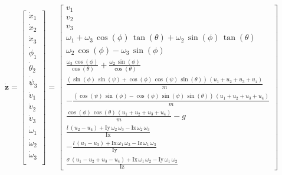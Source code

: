 \documentclass{article}
\begin{document}
\begin{equation}
    \dot{\boldsymbol{z}} = 
    \begin{bmatrix}
        \dot{x}_1 \\
        \dot{x}_2 \\
        \dot{x}_3 \\
        \dot{\phi}_1 \\
        \dot{\theta}_2 \\
        \dot{\psi}_3 \\
        \dot{v}_1 \\
        \dot{v}_2 \\
        \dot{v}_3 \\
        \dot{\omega}_1 \\
        \dot{\omega}_2 \\
        \dot{\omega}_3 \\
    \end{bmatrix}
    =
    \begin{bmatrix}
        v_1 \\
        v_2 \\
        v_3 \\[4pt]
        \omega_1 +\omega_3 \,\cos \left(\phi \right)\,\tan \left(\theta \right)+\omega_2 \,\sin \left(\phi \right)\,\tan \left(\theta \right)\\
        \omega_2 \,\cos \left(\phi \right)-\omega_3 \,\sin \left(\phi \right)\\[4pt]
        \frac{\omega_3 \,\cos \left(\phi \right)}{\cos \left(\theta \right)}+\frac{\omega_2 \,\sin \left(\phi \right)}{\cos \left(\theta \right)}\\[4pt]
        \frac{{\left(\sin \left(\phi \right)\,\sin \left(\psi \right)+\cos \left(\phi \right)\,\cos \left(\psi \right)\,\sin \left(\theta \right)\right)}\,{\left(u_1 +u_2 +u_3 +u_4 \right)}}{m}\\[4pt]
        -\frac{{\left(\cos \left(\psi \right)\,\sin \left(\phi \right)-\cos \left(\phi \right)\,\sin \left(\psi \right)\,\sin \left(\theta \right)\right)}\,{\left(u_1 +u_2 +u_3 +u_4 \right)}}{m}\\[4pt]
        \frac{\cos \left(\phi \right)\,\cos \left(\theta \right)\,{\left(u_1 +u_2 +u_3 +u_4 \right)}}{m}-g\\[4pt]
        \frac{l\,{\left(u_2 -u_4 \right)}+\mathrm{Iy}\,\omega_2 \,\omega_3 -\mathrm{Iz}\,\omega_2 \,\omega_3 }{\mathrm{Ix}}\\[4pt]
        -\frac{l\,{\left(u_1 -u_3 \right)}+\mathrm{Ix}\,\omega_1 \,\omega_3 -\mathrm{Iz}\,\omega_1 \,\omega_3 }{\mathrm{Iy}}\\[4pt]
        \frac{\sigma \,{\left(u_1 -u_2 +u_3 -u_4 \right)}+\mathrm{Ix}\,\omega_1 \,\omega_2 -\mathrm{Iy}\,\omega_1 \,\omega_2 }{\mathrm{Iz}}
        \end{bmatrix}
\end{equation}
\end{document}

